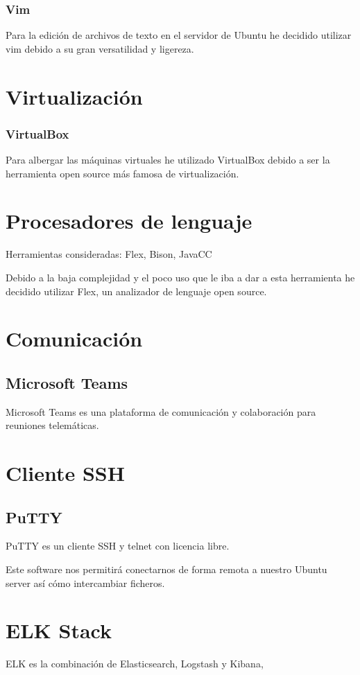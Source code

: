 \subsubsection{Vim}
Para la edición de archivos de texto en el servidor de Ubuntu he decidido utilizar vim debido a su gran versatilidad y ligereza.

\section{Virtualización}

\subsubsection{VirtualBox}
Para albergar las máquinas virtuales he utilizado VirtualBox debido a ser la herramienta open source más famosa de virtualización.

\section{Procesadores de lenguaje}
Herramientas consideradas: Flex, Bison, JavaCC

Debido a la baja complejidad y el poco uso que le iba a dar a esta herramienta he decidido utilizar Flex, un analizador de lenguaje open source.

\section{Comunicación}
\subsection{Microsoft Teams}
Microsoft Teams es una plataforma de comunicación y colaboración para reuniones telemáticas.


\section{Cliente SSH}
\subsection{PuTTY}
PuTTY es un cliente SSH  y telnet con licencia libre.

Este software nos permitirá conectarnos de forma remota a nuestro Ubuntu server así cómo intercambiar ficheros.

\section{ELK Stack}
ELK es la combinación de Elasticsearch, Logstash y Kibana, 
